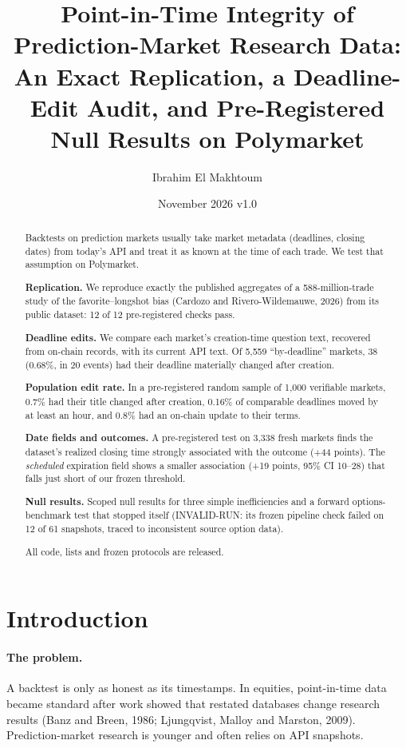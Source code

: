 \documentclass[10pt]{article}
\title{\vspace{-1.2em}Point-in-Time Integrity of Prediction-Market Research Data:\\
\large An Exact Replication, a Deadline-Edit Audit, and Pre-Registered Null Results on Polymarket}
\author{Ibrahim El Makhtoum}
\date{November 2026 \quad\textbullet\quad v1.0}
\begin{document}
\maketitle
\vspace{-1.5em}

\begin{abstract}
\noindent
Backtests on prediction markets usually take market metadata (deadlines,
closing dates) from today's API and treat it as known at the time of each
trade. We test that assumption on Polymarket.

\textbf{Replication.} We reproduce exactly the published aggregates of a
588-million-trade study of the favorite--longshot bias (Cardozo and
Rivero-Wildemauwe, 2026) from its public dataset: 12 of 12 pre-registered
checks pass.

\textbf{Deadline edits.} We compare each market's creation-time question text,
recovered from on-chain records, with its current API text. Of 5,559
``by-deadline'' markets, 38 (0.68\%, in 20 events) had their deadline
materially changed after creation.

\textbf{Population edit rate.} In a pre-registered random sample of 1,000
verifiable markets, 0.7\% had their title changed after creation, 0.16\% of
comparable deadlines moved by at least an hour, and 0.8\% had an on-chain
update to their terms.

\textbf{Date fields and outcomes.} A pre-registered test on 3,338 fresh markets
finds the dataset's realized closing time strongly associated with the outcome
(+44 points). The \emph{scheduled} expiration field shows a smaller association
(+19 points, 95\% CI 10--28) that falls just short of our frozen threshold.

\textbf{Null results.} Scoped null results for three simple inefficiencies and
a forward options-benchmark test that stopped itself (INVALID-RUN: its frozen
pipeline check failed on 12 of 61 snapshots, traced to inconsistent source
option data).

All code, lists and frozen protocols are released.
\end{abstract}

\section{Introduction}

\paragraph{The problem.} A backtest is only as honest as its timestamps. In
equities, point-in-time data became standard after work showed that restated
databases change research results (Banz and Breen, 1986; Ljungqvist, Malloy and
Marston, 2009). Prediction-market research is younger and often relies on API
snapshots.
\end{document}

